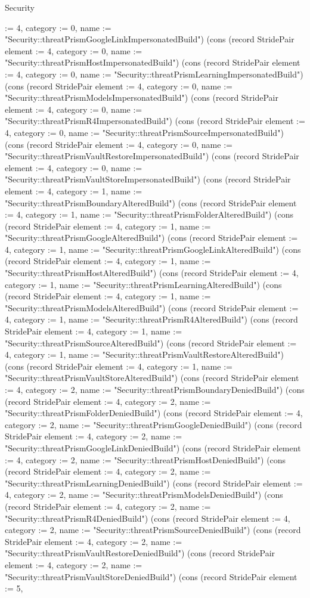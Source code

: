 \begin{lexlean}{Security}
\begin{semanticmodule}
{:= 4, category := 0, name := "Security::threatPrismGoogleLinkImpersonatedBuild"}) (cons (record StridePair {element := 4, category := 0, name := "Security::threatPrismHostImpersonatedBuild"}) (cons (record StridePair {element := 4, category := 0, name := "Security::threatPrismLearningImpersonatedBuild"}) (cons (record StridePair {element := 4, category := 0, name := "Security::threatPrismModelsImpersonatedBuild"}) (cons (record StridePair {element := 4, category := 0, name := "Security::threatPrismR4ImpersonatedBuild"}) (cons (record StridePair {element := 4, category := 0, name := "Security::threatPrismSourceImpersonatedBuild"}) (cons (record StridePair {element := 4, category := 0, name := "Security::threatPrismVaultRestoreImpersonatedBuild"}) (cons (record StridePair {element := 4, category := 0, name := "Security::threatPrismVaultStoreImpersonatedBuild"}) (cons (record StridePair {element := 4, category := 1, name := "Security::threatPrismBoundaryAlteredBuild"}) (cons (record StridePair {element := 4, category := 1, name := "Security::threatPrismFolderAlteredBuild"}) (cons (record StridePair {element := 4, category := 1, name := "Security::threatPrismGoogleAlteredBuild"}) (cons (record StridePair {element := 4, category := 1, name := "Security::threatPrismGoogleLinkAlteredBuild"}) (cons (record StridePair {element := 4, category := 1, name := "Security::threatPrismHostAlteredBuild"}) (cons (record StridePair {element := 4, category := 1, name := "Security::threatPrismLearningAlteredBuild"}) (cons (record StridePair {element := 4, category := 1, name := "Security::threatPrismModelsAlteredBuild"}) (cons (record StridePair {element := 4, category := 1, name := "Security::threatPrismR4AlteredBuild"}) (cons (record StridePair {element := 4, category := 1, name := "Security::threatPrismSourceAlteredBuild"}) (cons (record StridePair {element := 4, category := 1, name := "Security::threatPrismVaultRestoreAlteredBuild"}) (cons (record StridePair {element := 4, category := 1, name := "Security::threatPrismVaultStoreAlteredBuild"}) (cons (record StridePair {element := 4, category := 2, name := "Security::threatPrismBoundaryDeniedBuild"}) (cons (record StridePair {element := 4, category := 2, name := "Security::threatPrismFolderDeniedBuild"}) (cons (record StridePair {element := 4, category := 2, name := "Security::threatPrismGoogleDeniedBuild"}) (cons (record StridePair {element := 4, category := 2, name := "Security::threatPrismGoogleLinkDeniedBuild"}) (cons (record StridePair {element := 4, category := 2, name := "Security::threatPrismHostDeniedBuild"}) (cons (record StridePair {element := 4, category := 2, name := "Security::threatPrismLearningDeniedBuild"}) (cons (record StridePair {element := 4, category := 2, name := "Security::threatPrismModelsDeniedBuild"}) (cons (record StridePair {element := 4, category := 2, name := "Security::threatPrismR4DeniedBuild"}) (cons (record StridePair {element := 4, category := 2, name := "Security::threatPrismSourceDeniedBuild"}) (cons (record StridePair {element := 4, category := 2, name := "Security::threatPrismVaultRestoreDeniedBuild"}) (cons (record StridePair {element := 4, category := 2, name := "Security::threatPrismVaultStoreDeniedBuild"}) (cons (record StridePair {element := 5, }
\end{semanticmodule}
\end{lexlean}
